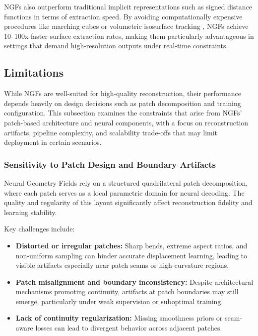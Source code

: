 NGFs also outperform traditional implicit representations such as signed distance functions in terms of extraction speed. 
By avoiding computationally expensive procedures like marching cubes or volumetric isosurface tracking \cite{mildenhall2020}, NGFs achieve 10--100x faster surface extraction rates, making them particularly advantageous in settings that demand high-resolution outputs under real-time constraints. 

\subsection{Limitations}

While NGFs are well-suited for high-quality reconstruction, their performance depends heavily on design decisions such as patch decomposition and training configuration. 
This subsection examines the constraints that arise from NGFs' patch-based architecture and neural components, with a focus on reconstruction artifacts, pipeline complexity, and scalability trade-offs that may limit deployment in certain scenarios.

\subsubsection{Sensitivity to Patch Design and Boundary Artifacts}

Neural Geometry Fields rely on a structured quadrilateral patch decomposition, where each patch serves as a local parametric domain for neural decoding. 
The quality and regularity of this layout significantly affect reconstruction fidelity and learning stability. 

Key challenges include:
\begin{itemize}
    \item \textbf{Distorted or irregular patches:} Sharp bends, extreme aspect ratios, and non-uniform sampling can hinder accurate displacement learning, leading to visible artifacts especially near patch seams or high-curvature regions.
    \item \textbf{Patch misalignment and boundary inconsistency:} Despite architectural mechanisms promoting continuity, artifacts at patch boundaries may still emerge, particularly under weak supervision or suboptimal training.
    \item \textbf{Lack of continuity regularization:} Missing smoothness priors or seam-aware losses can lead to divergent behavior across adjacent patches.
\end{itemize}

